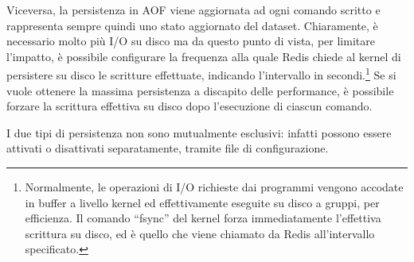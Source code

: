 Viceversa, la persistenza in AOF viene aggiornata ad ogni comando scritto e rappresenta sempre
quindi uno stato aggiornato del dataset. Chiaramente, è necessario molto più I/O su disco ma da
questo punto di vista, per limitare l'impatto, è possibile configurare la frequenza alla quale Redis
chiede al kernel di persistere su disco le scritture effettuate, indicando l'intervallo in
secondi.\footnote{Normalmente, le operazioni di I/O richieste dai programmi vengono accodate in
buffer a livello kernel ed effettivamente eseguite su disco a gruppi, per efficienza. Il comando
``fsync'' del kernel forza immediatamente l'effettiva scrittura su disco, ed è quello che viene
chiamato da Redis all'intervallo specificato.} Se si vuole ottenere la massima persistenza a
discapito delle performance, è possibile forzare la scrittura effettiva su disco dopo l'esecuzione
di ciascun comando.

I due tipi di persistenza non sono mutualmente esclusivi: infatti possono essere attivati o 
disattivati separatamente, tramite file di configurazione.
